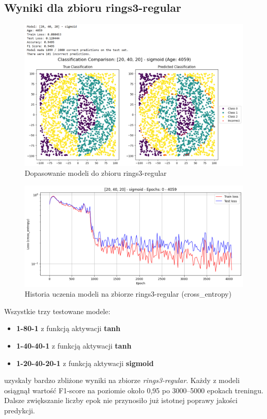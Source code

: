 \documentclass{article}
\begin{document}
\subsection*{Wyniki dla zbioru rings3-regular}
\begin{figure}[H]
    \centering
    \includegraphics[width=\textwidth]{img/nn5/rings3_fit.png}
    \caption{Dopasowanie modeli do zbioru rings3-regular}
\end{figure}
\begin{figure}[H]
    \centering
    \includegraphics[width=\textwidth]{img/nn5/rings3_history.png}
    \caption{Historia uczenia modeli na zbiorze rings3-regular (cross\_entropy)}
\end{figure}

Wszystkie trzy testowane modele:
\begin{itemize}
    \item \textbf{1-80-1} z funkcją aktywacji \textbf{tanh}
    \item \textbf{1-40-40-1} z funkcją aktywacji \textbf{tanh}
    \item \textbf{1-20-40-20-1} z funkcją aktywacji \textbf{sigmoid}
\end{itemize}
uzyskały bardzo zbliżone wyniki na zbiorze \textit{rings3-regular}. Każdy z modeli osiągnął wartość F1-score na poziomie około 0{,}95 po 3000--5000 epokach treningu. Dalsze zwiększanie liczby epok nie przynosiło już istotnej poprawy jakości predykcji.
\end{document}
